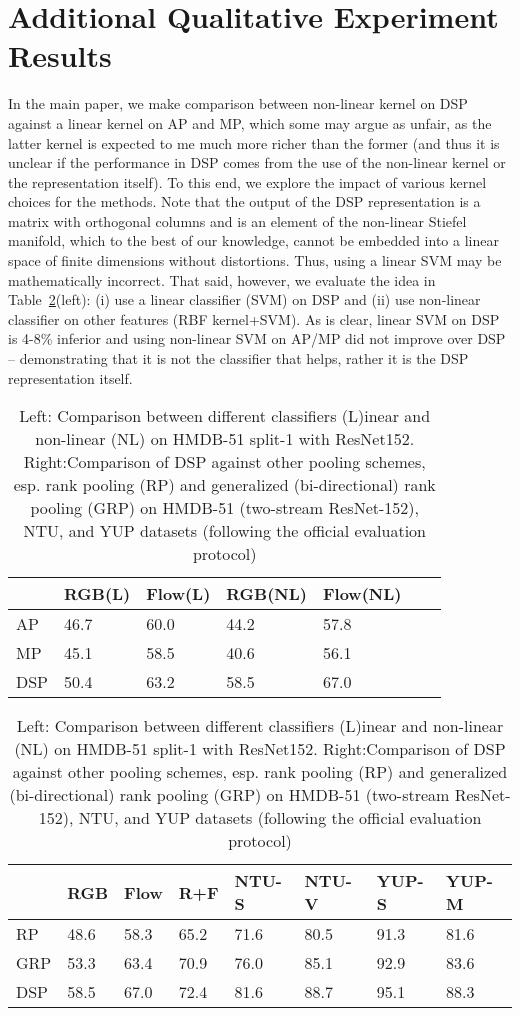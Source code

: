\documentclass[runningheads]{llncs}
\begin{document}
\section{Additional Qualitative Experiment Results}
In the main paper, we make comparison between non-linear kernel on DSP against a linear kernel on AP and MP, which some may argue as unfair, as the latter kernel is expected to me much more richer than the former (and thus it is unclear if the performance in DSP comes from the use of the non-linear kernel or the representation itself). To this end,  we explore the impact of various kernel choices for the methods. Note that the output of the DSP representation is a matrix with orthogonal columns and is an element of the non-linear Stiefel manifold, which to the best of our knowledge, cannot be embedded into a linear space of finite dimensions without distortions. Thus, using a linear SVM may be mathematically incorrect. That said, however, we evaluate the idea in Table~\ref{T1}(left): (i) use a linear classifier (SVM) on DSP and (ii) use non-linear classifier on other features (RBF kernel+SVM). As is clear, linear SVM on DSP is 4-8\% inferior and using non-linear SVM on AP/MP did not improve over DSP -- demonstrating that it is not the classifier that helps, rather it is the DSP representation itself. 
\begin{table}[ht]
\begin{adjustbox}{width=1.0\linewidth}
\centering
\begin{tabular}{|l|l|l|l|l|l|l|}
\hline
    & RGB(L) & Flow(L) & RGB(NL) & Flow(NL)\\ \hline
AP  & 46.7   & 60.0    & 44.2    & 57.8    \\ \hline
MP  & 45.1   & 58.5    & 40.6    & 56.1    \\ \hline
DSP & 50.4   & 63.2    & 58.5    & 67.0    \\ \hline
\end{tabular}
\quad
 \begin{tabular}{|l|l|l|l||l|l||l|l|}
\hline
             & RGB & Flow & R+F & {NTU-S} & {NTU-V} & {YUP-S} & {YUP-M} \\ \hline
RP           & 48.6   & 58.3   & 65.2     & 71.6   & 80.5   & 91.3  & 81.6  \\ \hline
GRP          & 53.3   & 63.4   & 70.9     & 76.0   & 85.1   & 92.9  & 83.6  \\ \hline
DSP          & 58.5   & 67.0   & 72.4     & 81.6   & 88.7   & 95.1  & 88.3  \\ \hline
\end{tabular}
\end{adjustbox}
\caption{Left: Comparison between different classifiers (L)inear and non-linear (NL) on HMDB-51 split-1 with ResNet152. Right:Comparison of DSP against other pooling schemes, esp. rank pooling (RP) and generalized (bi-directional) rank pooling (GRP) on HMDB-51 (two-stream ResNet-152), NTU, and YUP datasets (following the official evaluation protocol)}
\label{T1}
\end{table}
\end{document}
